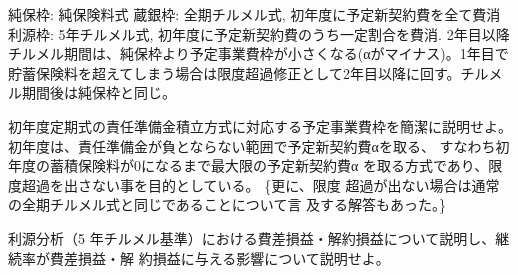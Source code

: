 \documentclass[report,gutter=10mm,fore-edge=10mm,uplatex,dvipdfmx]{jlreq}
\begin{document}
純保枠: 純保険料式
蔵銀枠: 全期チルメル式, 初年度に予定新契約費を全て費消
利源枠: 5年チルメル式, 初年度に予定新契約費のうち一定割合を費消. 2年目以降チルメル期間は、純保枠より予定事業費枠が小さくなる(αがマイナス)。1年目で貯蓄保険料を超えてしまう場合は限度超過修正として2年目以降に回す。チルメル期間後は純保枠と同じ。

初年度定期式の責任準備金積立方式に対応する予定事業費枠を簡潔に説明せよ。
\answer{}
初年度は、責任準備金が負とならない範囲で予定新契約費αを取る、
すなわち初年度の蓄積保険料が0になるまで最大限の予定新契約費α
を取る方式であり、限度超過を出さない事を目的としている。
\{更に、限度
超過が出ない場合は通常の全期チルメル式と同じであることについて言
及する解答もあった。\}

利源分析（5 年チルメル基準）における費差損益・解約損益について説明し、継続率が費差損益・解
約損益に与える影響について説明せよ。
\answer{}
\end{document}
